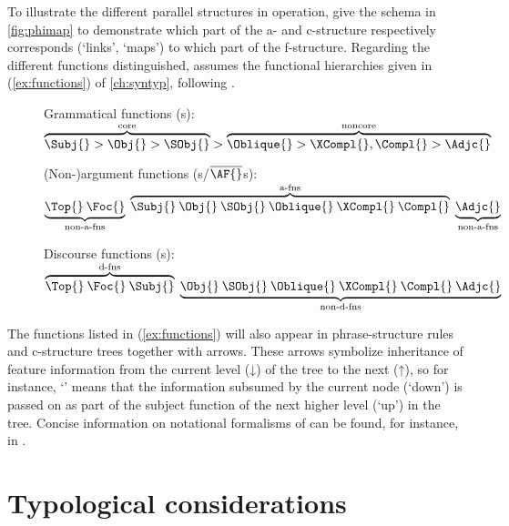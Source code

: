 To illustrate the different parallel structures in operation,
\citet[15]{bresnan2016} give the schema in \autoref{fig:phimap} to demonstrate
which part of the a- and c-structure respectively corresponds (`links', `maps')
to which part of the f-structure.
Regarding the different functions distinguished, \Lfg{} assumes the functional
hierarchies given in (\ref{ex:functions}) of \autoref{ch:syntyp}, following
\citet[97, 100]{bresnan2016}.

\begin{figure}[h]
\pex\label{ex:functions}
\a\label{ex:gfs} Grammatical functions (\GF{}s):\\
	$\overbrace{\Subj{} > \Obj{} > \SObj{}}^{\text{core}} > 
	\overbrace{\Oblique{} > \XCompl{}, \Compl{} > \Adjc{}}^{\text{noncore}}$

\a\label{ex:nonafs} (Non-)argument functions (\AF{}s/$\overline{\mbox{\AF{}}%
}$s):\\
	$\underbrace{\Top{}\: \Foc{}}_{\text{non-a-fns}}\; 
	\overbrace{\Subj{}\: \Obj{}\: \SObj{}\: \Oblique{}\: \XCompl{}\: 
		\Compl{}}^{\text{a-fns}}\; 
	\underbrace{\Adjc{}}_{\text{non-a-fns}}$

\a\label{ex:dfs} Discourse functions (\DF{}s):\\
	$\overbrace{\Top{}\: \Foc{}\: \Subj{}}^{\text{d-fns}}\;
	\underbrace{\Obj{}\: \SObj{}\: \Oblique{}\: \XCompl{}\: \Compl{}\: 
		\Adjc{}}_{\text{non-d-fns}}$
\xe
\end{figure}

The functions listed in (\ref{ex:functions}) will also appear in
phrase-structure rules and c-structure trees together with arrows. These arrows
symbolize inheritance of feature information from the current level (↓) of the
tree to the next (↑), so for instance, `\pass{\Subj}' means that the
information subsumed by the current node (`down') is passed on as part of the
subject function of the next higher level (`up') in the tree. Concise
information on notational formalisms of \Lfg{} can be found, for instance, in
\citet{buttking2015}.


\section{Typological considerations}
\label{sec:verbtypo}

